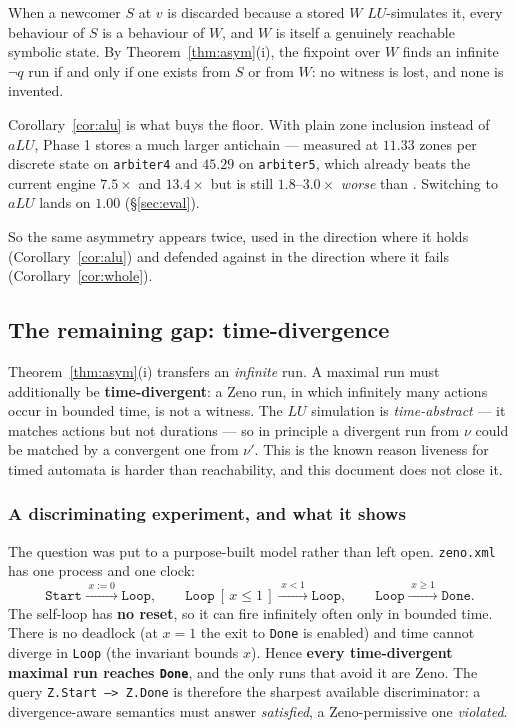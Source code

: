 \begin{corollary}
\label{cor:alu}
When a newcomer $S$ at $v$ is discarded because a stored $W$ $LU$-simulates it, every behaviour of
$S$ is a behaviour of $W$, and $W$ is itself a genuinely reachable symbolic state. By
Theorem~\ref{thm:asym}(i), the fixpoint over $W$ finds an infinite $\lnot q$ run if and only if one
exists from $S$ or from $W$: no witness is lost, and none is invented.
\end{corollary}

Corollary~\ref{cor:alu} is what buys the floor. With plain zone inclusion instead of $aLU$, Phase 1
stores a much larger antichain --- measured at $11.33$ zones per discrete state on
\texttt{arbiter4} and $45.29$ on \texttt{arbiter5}, which already beats the current engine
$7.5\times$ and $13.4\times$ but is still $1.8$--$3.0\times$ \emph{worse} than \uppaal{}. Switching
to $aLU$ lands on $1.00$ (\S\ref{sec:eval}).

So the same asymmetry appears twice, used in the direction where it holds
(Corollary~\ref{cor:alu}) and defended against in the direction where it fails
(Corollary~\ref{cor:whole}).

\subsection{The remaining gap: time-divergence}
\label{sec:soundness:zeno}

Theorem~\ref{thm:asym}(i) transfers an \emph{infinite} run. A maximal run must additionally be
\textbf{time-divergent}: a Zeno run, in which infinitely many actions occur in bounded time, is not
a witness. The $LU$ simulation is \emph{time-abstract} --- it matches actions but not durations ---
so in principle a divergent run from $\nu$ could be matched by a convergent one from $\nu'$. This
is the known reason liveness for timed automata is harder than reachability, and this document does
not close it. \openq{}

\subsubsection*{A discriminating experiment, and what it shows}

The question was put to a purpose-built model rather than left open. \texttt{zeno.xml} has one
process and one clock:
\[
  \texttt{Start} \xrightarrow{\;x:=0\;} \texttt{Loop},\qquad
  \texttt{Loop}\ [\,x \le 1\,] \xrightarrow{\;x<1\;} \texttt{Loop},\qquad
  \texttt{Loop} \xrightarrow{\;x \ge 1\;} \texttt{Done}.
\]
The self-loop has \textbf{no reset}, so it can fire infinitely often only in bounded time. There is
no deadlock (at $x=1$ the exit to \texttt{Done} is enabled) and time cannot diverge in
\texttt{Loop} (the invariant bounds $x$). Hence \textbf{every time-divergent maximal run reaches
\texttt{Done}}, and the only runs that avoid it are Zeno. The query \texttt{Z.Start --> Z.Done} is
therefore the sharpest available discriminator: a divergence-aware semantics must answer
\emph{satisfied}, a Zeno-permissive one \emph{violated}.

